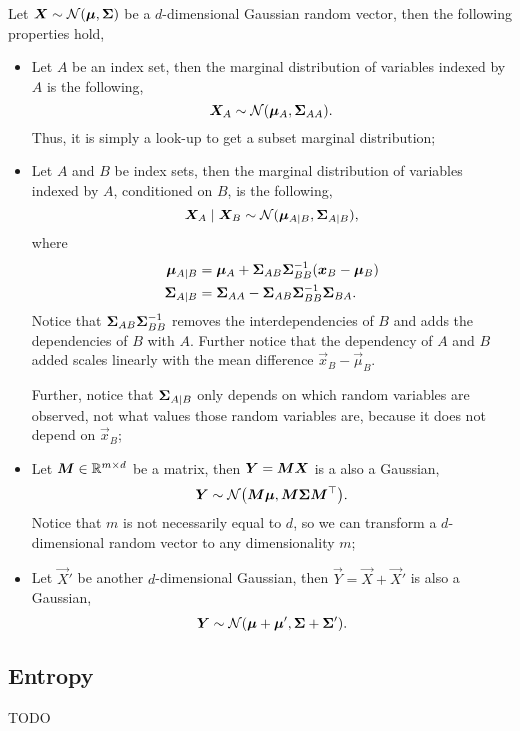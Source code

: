 
Let $\bm{X} \sim \mathcal{N}(\bm{\mu},\bm{\Sigma})$ be a $d$-dimensional
Gaussian random vector, then the following properties hold,
\begin{itemize}
  \item Let $A$ be an index set, then the marginal distribution of variables
    indexed by $A$ is the following, \[
      \bm{X}_A \sim \mathcal{N}(\bm{\mu}_A,\bm{\Sigma}_{AA})
    .\]
    Thus, it is simply a look-up to get a subset marginal distribution;

  \item Let $A$ and $B$ be index sets, then the marginal distribution of
    variables indexed by $A$, conditioned on $B$, is the following, \[
      \bm{X}_A\mid \bm{X}_B \sim \mathcal{N}(\bm{\mu}_{A\mid
      B},\bm{\Sigma}_{A\mid B})
    ,\]
    where
    \begin{align*}
      \bm{\mu}_{A\mid B} &= \bm{\mu}_A + \bm{\Sigma}_{AB}\bm{\Sigma}_{BB}^{-1} (\bm{x}_B - \bm{\mu}_B) \\
      \bm{\Sigma}_{A\mid B} &= \bm{\Sigma}_{AA} - \bm{\Sigma}_{AB}\bm{\Sigma}_{BB}^{-1}\bm{\Sigma}_{BA}
    .\end{align*}
    Notice that $\bm{\Sigma}_{AB}\bm{\Sigma}_{BB}^{-1}$ removes the interdependencies
    of $B$ and adds the dependencies of $B$ with $A$. Further notice that the
    dependency of $A$ and $B$ added scales linearly with the mean difference
    $\vec{x}_B - \vec{\mu}_B$.

    Further, notice that $\bm{\Sigma}_{A\mid B}$ only depends on which random
    variables are observed, not what values those random variables are, because
    it does not depend on $\vec{x}_B$;

  \item Let $\bm{M}\in\mathbb{R}^{m\times d}$ be a matrix, then $\bm{Y} =
    \bm{M}\bm{X}$ is a also a Gaussian, \[
      \vec{Y} \sim \mathcal{N}\lft( \mat{M}\vec{\mu}, \mat{M}\mat{\Sigma}\transpose{\mat{M}} \rgt)
    .\]
    Notice that $m$ is not necessarily equal to $d$, so we can transform a
    $d$-dimensional random vector to any dimensionality $m$;

  \item Let $\vec{X}'$ be another $d$-dimensional Gaussian, then
    $\vec{Y}=\vec{X}+\vec{X}'$ is also a Gaussian, \[
      \vec{Y} \sim \mathcal{N} \lft( \vec{\mu} + \vec{\mu}', \mat{\Sigma} + \mat{\Sigma}' \rgt)
    .\]
\end{itemize}

\subsection{Entropy}

TODO
